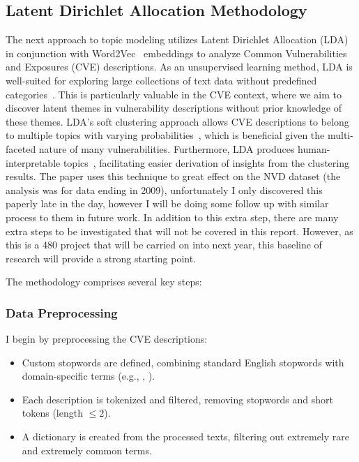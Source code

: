 \documentclass[12pt]{article}
\begin{document}
\subsection{Latent Dirichlet Allocation Methodology}

The next approach to topic modeling utilizes Latent Dirichlet Allocation (LDA)~\cite{lda_origin} in
conjunction with Word2Vec~\cite{word2vec} embeddings to analyze Common Vulnerabilities and Exposures
(CVE) descriptions. As an unsupervised learning method, LDA is well-suited for exploring large
collections of text data without predefined categories~\cite{lda_origin, latent_handbook}. This is
particularly valuable in the CVE context, where we aim to discover latent themes in vulnerability
descriptions without prior knowledge of these themes. LDA's soft clustering approach allows CVE
descriptions to belong to multiple topics with varying probabilities~\cite{latent_handbook}, which is beneficial given
the multi-faceted nature of many vulnerabilities. Furthermore, LDA produces human-interpretable
topics~\cite{lda_origin}, facilitating easier derivation of insights from the clustering results.
The paper \cite{cve_topic_modelling} uses this technique to great effect on the NVD
dataset (the analysis was for data ending in 2009), unfortunately I only discovered this paperly
late in the day, however I will be doing some follow up with similar process to them in future work.
In addition to this extra step, there are many extra steps to be investigated that will not be
covered in this report. However, as this is a 480 project that will be carried on into next year,
this baseline of research will provide a strong
starting point.

The methodology comprises several key steps:

\subsubsection*{Data Preprocessing} I begin by preprocessing the CVE descriptions:

\begin{itemize}

	\item Custom stopwords are defined, combining standard English stopwords with domain-specific
	      terms (e.g., , ).

	\item Each description is tokenized and filtered, removing stopwords and short tokens (length
	      $\leq 2$).

	\item A dictionary is created from the processed texts, filtering out extremely rare and
	      extremely common terms.

\end{itemize}
\end{document}
